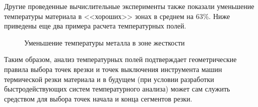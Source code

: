 \documentclass[11pt,twoside,openany]{report}
\begin{document}
Другие проведенные вычислительные эксперименты
также показали уменьшение температуры материала
в <<хороших>> зонах в среднем на 63\%.
Ниже приведены еще два примера расчета температурных полей.

\begin{figure}
  \centering
  \caption{Уменьшение температуры металла в зоне жесткости }
  \label{thermal-309-120}
\end{figure}

Таким образом,
анализ температурных полей подтверждает
геометрические правила выбора точек врезки
и точек выключения инструмента машин термической
резки материала и в будущем
(при условии разработки быстродействующих систем температурного анализа)
может сам служить средством для выбора точек начала и конца сегментов резки.
\end{document}
